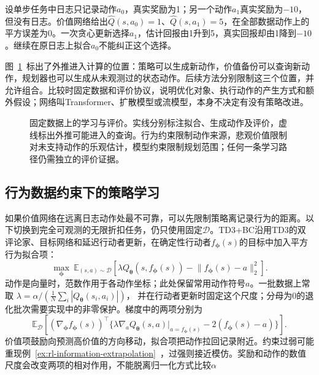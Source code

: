 \begin{example}[一次贪心更新利用了外推错误]
  \label{ex:rl-information-extrapolation}
  设单步任务中日志只记录动作$a_0$，真实奖励为1；另一个动作$a_1$真实奖励为$-10$，但没有日志。价值网络给出$\widehat Q(s,a_0)=1$、$\widehat Q(s,a_1)=5$，在全部数据动作上的平方误差为0。一次贪心更新选择$a_1$，估计回报由1升到5，真实回报却由1降到$-10$。继续在原日志上拟合$a_0$不能纠正这个选择。
\end{example}

图~\ref{fig:rl-information-offline-pipeline}~标出了外推进入计算的位置：策略可以生成新动作，价值备份可以查询新动作，规划器也可以生成从未观测过的状态动作。后续方法分别限制这三个位置，并允许组合。比较时固定数据和评价协议，说明优化对象、执行动作的产生方式和额外假设；网络叫Transformer、扩散模型或流模型，本身不决定有没有策略改进。

\begin{figure}[htbp]
  \centering
  
  \caption{固定数据上的学习与评价。实线分别标注拟合、生成动作及评价，虚线标出外推可能进入的查询。行为约束限制动作来源，悲观价值限制对未支持动作的乐观估计，模型约束限制规划范围；任何一条学习路径仍需独立的评价证据。}
  \label{fig:rl-information-offline-pipeline}
\end{figure}

\subsection{行为数据约束下的策略学习}
\label{sec:rl-information-behavior-constraint}

如果价值网络在远离日志动作处最不可靠，可以先限制策略离记录行为的距离。以下切换到完全可观测的无限折扣任务，仍只使用固定$\mathcal D$。TD3+BC沿用TD3的双评论家、目标网络和延迟行动者更新，在确定性行动者$f_{\bm\phi}(s)$的目标中加入平方行为拟合项：
\begin{equation}
  \label{eq:rl-information-td3bc}
  \max_{\bm\phi}\ %
  \mathbb E_{(s,a)\sim\mathcal D}
  \left[\lambda Q_{\bm\theta}(s,f_{\bm\phi}(s))
            -\lVert f_{\bm\phi}(s)-a\rVert_2^2\right].
\end{equation}
动作是向量时，范数作用于各动作坐标；此处保留常用动作符号$a$。一批数据上常取
$\lambda=\alpha/(\frac1N\sum_i|Q_{\bm\theta}(s_i,a_i)|)$，
并在行动者更新时固定这个尺度；分母为0的退化批次需要实现中的非零保护。梯度中的两项分别为
\[
  \mathbb E_{\mathcal D}
  \left[(\nabla_{\bm\phi}f_{\bm\phi}(s))^\top
  \{\lambda\nabla_a Q_{\bm\theta}(s,a)|_{a=f_{\bm\phi}(s)}
          -2(f_{\bm\phi}(s)-a)\}\right].
\]
价值项鼓励向预测高价值的方向移动，拟合项把动作拉回记录附近。约束过弱可能重现例~\ref{ex:rl-information-extrapolation}~，过强则接近模仿。奖励和动作的数值尺度会改变两项的相对作用，不能脱离归一化方式比较$\alpha$

